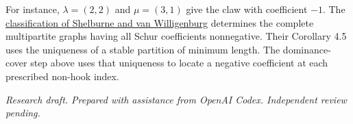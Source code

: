\documentclass[11pt]{article}
\begin{document}
For instance, $\lambda=(2,2)$ and $\mu=(3,1)$ give the claw with coefficient $-1$. The \href{https://arxiv.org/abs/2604.26158}{classification of Shelburne and van Willigenburg} determines the complete multipartite graphs having all Schur coefficients nonnegative. Their Corollary 4.5 uses the uniqueness of a stable partition of minimum length. The dominance-cover step above uses that uniqueness to locate a negative coefficient at each prescribed non-hook index.

\medskip\noindent\textit{Research draft. Prepared with assistance from OpenAI Codex. Independent review pending.}
\end{document}
